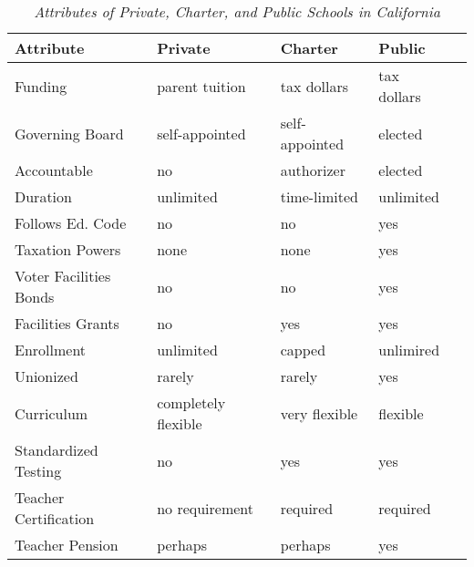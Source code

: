 \begin{table}[ht]
  \caption[Attributes of Private, Charter, and Public Schools in California]{\textit{Attributes of Private, Charter, and Public Schools in California}}\label{tab:school_attributes}%
  \begin{tabularx}{\textwidth}{lllll}
    \toprule
    \textbf{Attribute}     & \textbf{Private}    & \textbf{Charter} & \textbf{Public}               \\
    \midrule
    Funding                & parent tuition      & tax dollars      & tax dollars      \vspace{0.5ex} \\
    Governing Board        & self-appointed      & self-appointed   & elected          \vspace{0.5ex} \\
    Accountable            & no                  & authorizer       & elected          \vspace{0.5ex} \\
    Duration               & unlimited           & time-limited     & unlimited        \vspace{0.5ex} \\
    Follows Ed. Code       & no                  & no               & yes              \vspace{0.5ex} \\
    Taxation Powers        & none                & none             & yes              \vspace{0.5ex} \\
    Voter Facilities Bonds & no                  & no               & yes              \vspace{0.5ex} \\
    Facilities Grants      & no                  & yes              & yes              \vspace{0.5ex} \\
    Enrollment             & unlimited           & capped           & unlimired        \vspace{0.5ex} \\
    Unionized              & rarely              & rarely           & yes              \vspace{0.5ex} \\
    Curriculum             & completely flexible & very flexible    & flexible         \vspace{0.5ex} \\
    Standardized Testing   & no                  & yes              & yes              \vspace{0.5ex} \\
    Teacher Certification  & no requirement      & required         & required         \vspace{0.5ex} \\
    Teacher Pension        & perhaps             & perhaps          & yes                           \\
    \bottomrule
  \end{tabularx}
\end{table}

